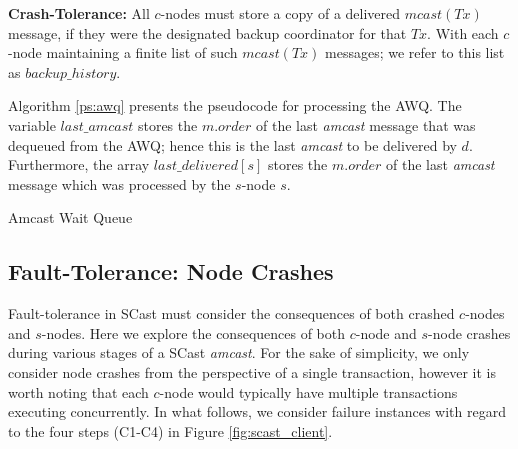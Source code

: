 \begin{enumerate}
        \textbf{Crash-Tolerance:} All $c$-nodes must store a copy of a delivered $mcast(Tx)$ message, if they were the designated backup coordinator for that $Tx$.  With each $c$-node maintaining a finite list of such $mcast(Tx)$ messages; we refer to this list as $backup\_history$.  
        \endleftbar

        Algorithm \ref{ps:awq} presents the pseudocode for processing the AWQ.  The variable $last\_amcast$ stores the $m.order$ of the last \emph{amcast} message that was dequeued from the AWQ; hence this is the last \emph{amcast} to be delivered by $d$.  Furthermore, the array $last\_delivered[s]$ stores the $m.order$ of the last \emph{amcast} message which was processed by the $s$-node $s$.  
    
    \end{enumerate}
    \begin{algorithm}[H]
       \caption{Amcast Wait Queue}
        \label{ps:awq}
        \begin{algorithmic}[1]	        
	                
	                \ENDIF
	            \ENDIF
	            \ENDIF
	        \ENDWHILE
        \end{algorithmic}
    \end{algorithm}   
	\subsection{Fault-Tolerance: Node Crashes}\label{ssec:scast_fault_tolerance}
	Fault-tolerance in \textsf{SCast} must consider the consequences of both crashed $c$-nodes and $s$-nodes.  Here we explore the consequences of both $c$-node and $s$-node crashes during various stages of a \textsf{SCast} \emph{amcast}.  For the sake of simplicity, we only consider node crashes from the perspective of a single transaction, however it is worth noting that each $c$-node would typically have multiple transactions executing concurrently.  In what follows, we consider failure instances with regard to the four steps (C1-C4) in Figure \ref{fig:scast_client}.  
	
